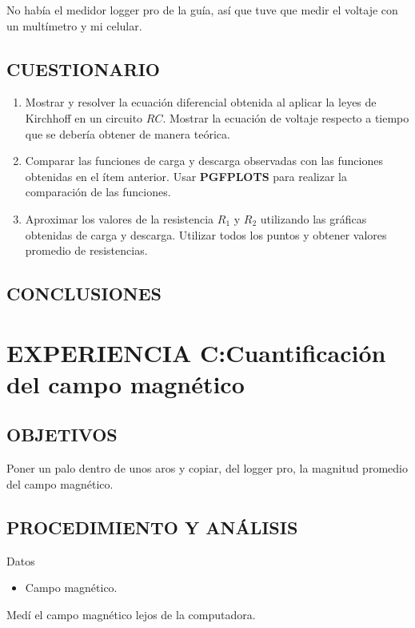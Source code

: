 \documentclass[10pt, twoside]{article}
\begin{document}
No había el medidor logger pro de la guía,
así que tuve que medir el voltaje con un multímetro y mi celular.

\subsection{CUESTIONARIO}%
\begin{enumerate}[label=\roman*]
	\item Mostrar y resolver la ecuación diferencial obtenida al aplicar la
		leyes de Kirchhoff en un circuito $RC$.
		Mostrar la ecuación de voltaje respecto a tiempo que se debería
		obtener de manera teórica.
	\item Comparar las funciones de carga y descarga observadas con las
		funciones obtenidas en el ítem anterior.
		Usar \textbf{PGFPLOTS} para realizar la comparación de las funciones.
	\item Aproximar los valores de la resistencia $R_1$ y $R_2$ utilizando
		las gráficas obtenidas de carga y descarga.
		Utilizar todos los puntos y obtener valores promedio de resistencias.
\end{enumerate}

\subsection{CONCLUSIONES}%

\section{EXPERIENCIA C:Cuantificación del campo magnético}%

\subsection{OBJETIVOS}%

Poner un palo dentro de unos aros y copiar, del logger pro, la magnitud promedio
del campo magnético.

\subsection{PROCEDIMIENTO Y ANÁLISIS}%
Datos
\begin{itemize}
	\item Campo magnético.
\end{itemize}

Medí el campo magnético lejos de la computadora.
\end{document}
